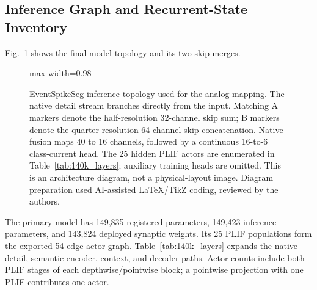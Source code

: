 \documentclass[preprint,12pt,number]{elsarticle}
\newcommand{\NumParams}{149,835}
\newcommand{\ExecParams}{149,423}
\newcommand{\SynWeights}{143,824}
\begin{document}
\subsection{Inference Graph and Recurrent-State Inventory}
Fig.~\ref{fig:base_arch} shows the final model topology and its two skip merges.

\begin{figure}[!t]
\centering
\begin{adjustbox}{max width=0.98\textwidth}\end{adjustbox}
\caption{EventSpikeSeg inference topology used for the analog mapping. The native detail stream branches directly from the input. Matching A markers denote the half-resolution 32-channel skip sum; B markers denote the quarter-resolution 64-channel skip concatenation. Native fusion maps 40 to 16 channels, followed by a continuous 16-to-6 class-current head. The 25 hidden PLIF actors are enumerated in Table~\ref{tab:140k_layers}; auxiliary training heads are omitted. This is an architecture diagram, not a physical-layout image. Diagram preparation used AI-assisted LaTeX/TikZ coding, reviewed by the authors.}
\label{fig:base_arch}
\end{figure}

The primary model has \NumParams{} registered parameters, \ExecParams{} inference parameters, and \SynWeights{} deployed synaptic weights. Its 25 PLIF populations form the exported 54-edge actor graph. Table~\ref{tab:140k_layers} expands the native detail, semantic encoder, context, and decoder paths. Actor counts include both PLIF stages of each depthwise/pointwise block; a pointwise projection with one PLIF contributes one actor.
\end{document}
